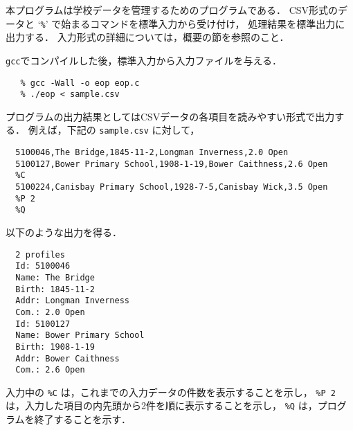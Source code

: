 \documentclass[a4j,11pt]{jarticle}
\begin{document}

本プログラムは学校データを管理するためのプログラムである．
CSV形式のデータと `\verb|%|' で始まるコマンドを標準入力から受け付け，
処理結果を標準出力に出力する．
入力形式の詳細については，概要の節を参照のこと．

\verb|gcc|でコンパイルした後，標準入力から入力ファイルを与える．

{\fontsize{10pt}{11pt} \selectfont
 \begin{verbatim}
   % gcc -Wall -o eop eop.c
   % ./eop < sample.csv
 \end{verbatim}
}

プログラムの出力結果としてはCSVデータの各項目を読みやすい形式で出力する．
例えば，下記の \verb|sample.csv| に対して，

{\fontsize{10pt}{11pt} \selectfont
 \begin{verbatim}
  5100046,The Bridge,1845-11-2,Longman Inverness,2.0 Open
  5100127,Bower Primary School,1908-1-19,Bower Caithness,2.6 Open
  %C
  5100224,Canisbay Primary School,1928-7-5,Canisbay Wick,3.5 Open
  %P 2
  %Q
 \end{verbatim}
}

\noindent %
以下のような出力を得る．

{\fontsize{10pt}{11pt} \selectfont
 \begin{verbatim}
  2 profiles
  Id: 5100046
  Name: The Bridge
  Birth: 1845-11-2
  Addr: Longman Inverness
  Com.: 2.0 Open
  Id: 5100127
  Name: Bower Primary School
  Birth: 1908-1-19
  Addr: Bower Caithness
  Com.: 2.6 Open
 \end{verbatim}
}

\noindent
入力中の
\verb|%C| は，これまでの入力データの件数を表示することを示し，
\verb|%P 2|  は，入力した項目の内先頭から2件を順に表示することを示し，
\verb|%Q| は，プログラムを終了することを示す．
\end{document}
